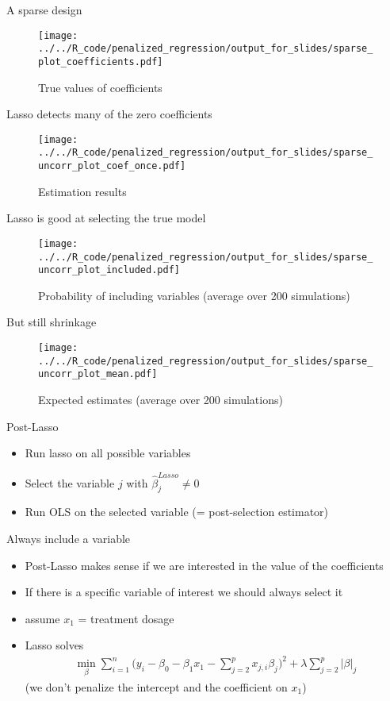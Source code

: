 \documentclass[xcolor=dvipsnames, handout]{beamer}
\begin{document}
\begin{frame}{A sparse design}
\begin{figure}
  \texttt{[image: ../../R\_code/penalized\_regression/output\_for\_slides/sparse\_plot\_coefficients.pdf]}
   \caption{True values of coefficients}
\end{figure}
\end{frame}

\begin{frame}{Lasso detects many of the zero coefficients}
\begin{figure}
  \texttt{[image: ../../R\_code/penalized\_regression/output\_for\_slides/sparse\_uncorr\_plot\_coef\_once.pdf]}
   \caption{Estimation results}
\end{figure}
\end{frame}

\begin{frame}{Lasso is good at selecting the true model}
\begin{figure}
  \texttt{[image: ../../R\_code/penalized\_regression/output\_for\_slides/sparse\_uncorr\_plot\_included.pdf]}
   \caption{Probability of including variables (average over 200 simulations)}
\end{figure}
\end{frame}

\begin{frame}{But still shrinkage}
\begin{figure}
  \texttt{[image: ../../R\_code/penalized\_regression/output\_for\_slides/sparse\_uncorr\_plot\_mean.pdf]}
   \caption{Expected estimates (average over 200 simulations)}
\end{figure}
\end{frame}

\begin{frame}{Post-Lasso}
\begin{itemize}
  \item Run lasso on all possible variables 
  \item Select the variable $j$ with $\hat{\beta}_j^{Lasso} \neq 0$
  \item Run OLS on the selected variable (= post-selection estimator)
\end{itemize}
\end{frame}

\begin{frame}{Always include a variable}
\begin{itemize}
  \item Post-Lasso makes sense if we are interested in the value of the coefficients
  \item If there is a specific variable of interest we should always select it
  \item assume $x_1$ = treatment dosage
  \item Lasso solves 
  \begin{align*}
    \min_{\beta} \sum_{i=1}^n \Big(y_i - \beta_0 - \beta_1 x_1 - \sum_{j = 2}^p x_{j, i} \beta_j \Big)^2 + \lambda \sum_{j = 2}^p \lvert\beta\rvert_j   
  \end{align*}
  (we don't penalize the intercept and the coefficient on $x_1$)
\end{itemize}
\end{frame}
\end{document}
